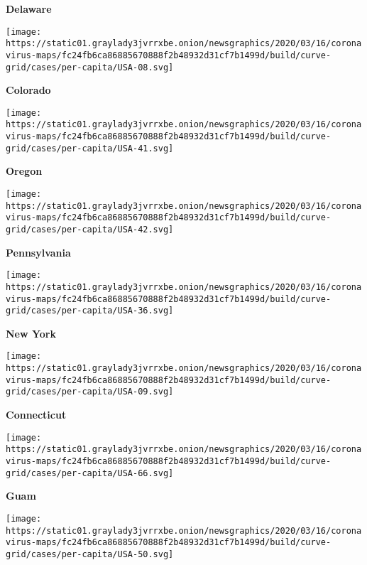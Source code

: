 \textbf{Delaware}

\href{https://www.nytimes3xbfgragh.onion/interactive/2020/us/colorado-coronavirus-cases.html}{}

\texttt{[image: https://static01.graylady3jvrrxbe.onion/newsgraphics/2020/03/16/coronavirus-maps/fc24fb6ca86885670888f2b48932d31cf7b1499d/build/curve-grid/cases/per-capita/USA-08.svg]}

\textbf{Colorado}

\href{https://www.nytimes3xbfgragh.onion/interactive/2020/us/oregon-coronavirus-cases.html}{}

\texttt{[image: https://static01.graylady3jvrrxbe.onion/newsgraphics/2020/03/16/coronavirus-maps/fc24fb6ca86885670888f2b48932d31cf7b1499d/build/curve-grid/cases/per-capita/USA-41.svg]}

\textbf{Oregon}

\href{https://www.nytimes3xbfgragh.onion/interactive/2020/us/pennsylvania-coronavirus-cases.html}{}

\texttt{[image: https://static01.graylady3jvrrxbe.onion/newsgraphics/2020/03/16/coronavirus-maps/fc24fb6ca86885670888f2b48932d31cf7b1499d/build/curve-grid/cases/per-capita/USA-42.svg]}

\textbf{Pennsylvania}

\href{https://www.nytimes3xbfgragh.onion/interactive/2020/us/new-york-coronavirus-cases.html}{}

\texttt{[image: https://static01.graylady3jvrrxbe.onion/newsgraphics/2020/03/16/coronavirus-maps/fc24fb6ca86885670888f2b48932d31cf7b1499d/build/curve-grid/cases/per-capita/USA-36.svg]}

\textbf{New York}

\href{https://www.nytimes3xbfgragh.onion/interactive/2020/us/connecticut-coronavirus-cases.html}{}

\texttt{[image: https://static01.graylady3jvrrxbe.onion/newsgraphics/2020/03/16/coronavirus-maps/fc24fb6ca86885670888f2b48932d31cf7b1499d/build/curve-grid/cases/per-capita/USA-09.svg]}

\textbf{Connecticut}

\texttt{[image: https://static01.graylady3jvrrxbe.onion/newsgraphics/2020/03/16/coronavirus-maps/fc24fb6ca86885670888f2b48932d31cf7b1499d/build/curve-grid/cases/per-capita/USA-66.svg]}

\textbf{Guam}

\href{https://www.nytimes3xbfgragh.onion/interactive/2020/us/vermont-coronavirus-cases.html}{}

\texttt{[image: https://static01.graylady3jvrrxbe.onion/newsgraphics/2020/03/16/coronavirus-maps/fc24fb6ca86885670888f2b48932d31cf7b1499d/build/curve-grid/cases/per-capita/USA-50.svg]}

